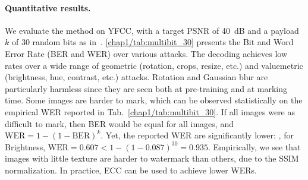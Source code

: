 \paragraph*{Quantitative results.}\label{chap1/par:multibit_quantitative_results}
We evaluate the method on YFCC, with  a target PSNR of 40~dB and a payload $k$ of $30$ random bits as in~\citep{zhu2018hidden,luo2020distortion}.
\autoref{chap1/tab:multibit_30} presents the Bit and Word Error Rate (BER and WER) over various attacks. The decoding achieves low rates over a wide range of geometric (rotation, crops, resize, etc.) and valuemetric (brightness, hue, contrast, etc.) attacks.
Rotation and Gaussian blur are particularly harmless since they are seen both at pre-training and at marking time.
Some images are harder to mark, which can be observed statistically on the empirical WER reported in Tab.~\ref{chap1/tab:multibit_30}. 
If all images were as difficult to mark, then BER would be equal for all images, and $\mathrm{WER} =1- (1-\mathrm{BER})^{k}$. 
Yet, the reported WER are significantly lower: \eg, for Brightness, $\mathrm{WER} = 0.607 < 1-(1-0.087)^{30} = 0.935$. 
Empirically, we see that images with little texture are harder to watermark than others, due to the SSIM normalization.
In practice, ECC can be used to achieve lower WERs.

\begin{table}[t]
    \centering
    \caption{}
    \label{chap1/tab:multibit_30}
\end{table}





